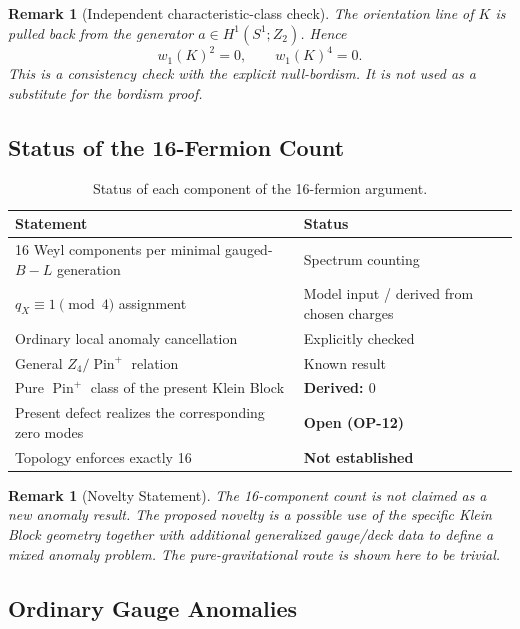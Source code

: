 \documentclass[11pt]{article}
\theoremstyle{canonmath}
\newtheorem{remark}[theorem]{Remark}
\theoremstyle{canonpostulate}
\theoremstyle{canonclaim}
\providecommand{\Klein}{\mathcal{K}}
\providecommand{\Ztwo}{\mathbb{Z}_2}
\providecommand{\Sone}{S^1}
\providecommand{\Pin}{\operatorname{Pin}}
\def\mathbb#1{#1}%
\def\mathcal#1{#1}%
\begin{document}
\begin{remark}[Independent characteristic-class check]
The orientation line of $\Klein$ is pulled back from the generator $a\in H^1(\Sone;\Ztwo)$. Hence
\begin{equation}
w_1(\Klein)^2=0,
\qquad
w_1(\Klein)^4=0.
\end{equation}
This is a consistency check with the explicit null-bordism. It is not used as a substitute for the bordism proof.
\end{remark}

\subsection{Status of the 16-Fermion Count}

\begin{table}[H]
\centering
\caption{Status of each component of the 16-fermion argument.}
\begin{tabular}{@{}p{}p{}@{}}
\toprule
\textbf{Statement} & \textbf{Status} \\
\midrule
16 Weyl components per minimal gauged-$B-L$ generation & Spectrum counting \\
$q_X\equiv1\pmod4$ assignment & Model input / derived from chosen charges \\
Ordinary local anomaly cancellation & Explicitly checked \\
General $\mathbb Z_4/\Pin^+$ relation & Known result~\cite{GarciaEtxebarria} \\
Pure $\Pin^+$ class of the present Klein Block & \textbf{Derived: $0$} \\
Present defect realizes the corresponding zero modes & \textbf{Open (OP-12)} \\
Topology enforces exactly 16 & \textbf{Not established} \\
\bottomrule
\end{tabular}
\end{table}

\begin{remark}[Novelty Statement]
The 16-component count is not claimed as a new anomaly result. The proposed novelty is a possible use of the specific Klein Block geometry together with additional generalized gauge/deck data to define a mixed anomaly problem. The pure-gravitational route is shown here to be trivial.
\end{remark}

\subsection{Ordinary Gauge Anomalies}
\end{document}
